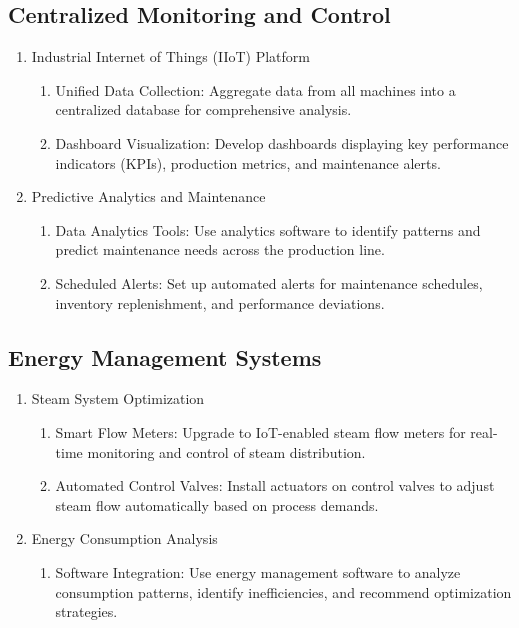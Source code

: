 \subsection{Centralized Monitoring and Control}
\begin{enumerate}
    \item Industrial Internet of Things (IIoT) Platform
    \begin{enumerate}
        \item Unified Data Collection: Aggregate data from all machines into a centralized database for comprehensive analysis.
        \item Dashboard Visualization: Develop dashboards displaying key performance indicators (KPIs), production metrics, and maintenance alerts.
    \end{enumerate}
    \item Predictive Analytics and Maintenance
    \begin{enumerate}
        \item Data Analytics Tools: Use analytics software to identify patterns and predict maintenance needs across the production line.
        \item Scheduled Alerts: Set up automated alerts for maintenance schedules, inventory replenishment, and performance deviations.
    \end{enumerate}
\end{enumerate}

\subsection{Energy Management Systems}
\begin{enumerate}
    \item Steam System Optimization
    \begin{enumerate}
        \item Smart Flow Meters: Upgrade to IoT-enabled steam flow meters for real-time monitoring and control of steam distribution.
        \item Automated Control Valves: Install actuators on control valves to adjust steam flow automatically based on process demands.
    \end{enumerate}
    \item Energy Consumption Analysis
    \begin{enumerate}
        \item Software Integration: Use energy management software to analyze consumption patterns, identify inefficiencies, and recommend optimization strategies.
    \end{enumerate}
\end{enumerate}

